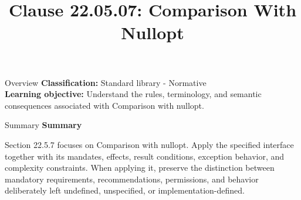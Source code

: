 \documentclass[10pt,letterpaper]{article}
\title{Clause 22.05.07: Comparison With Nullopt}
\author{}
\date{}
\begin{document}
\maketitle
\begin{CornellOverviewBox}{Overview}
\textbf{Classification:} Standard library - Normative\\[2pt]
\textbf{Learning objective:} Understand the rules, terminology, and semantic consequences associated with Comparison with nullopt.
\end{CornellOverviewBox}\begin{CornellSummaryBox}{Summary}
{\sffamily\bfseries\color{Accent} Summary}\par\vspace{3pt}Section 22.5.7 focuses on Comparison with nullopt. Apply the specified interface together with its mandates, effects, result conditions, exception behavior, and complexity constraints. When applying it, preserve the distinction between mandatory requirements, recommendations, permissions, and behavior deliberately left undefined, unspecified, or implementation-defined.
\end{CornellSummaryBox}
\end{document}
